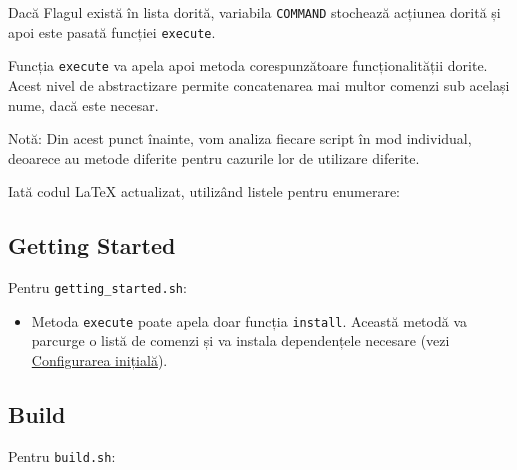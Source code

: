 Dacă Flagul există în lista dorită, variabila \texttt{COMMAND} stochează acțiunea dorită și apoi este pasată funcției \texttt{execute}.

Funcția \texttt{execute} va apela apoi metoda corespunzătoare funcționalității dorite. Acest nivel de abstractizare permite concatenarea mai multor comenzi sub același nume, dacă este necesar.

Notă: Din acest punct înainte, vom analiza fiecare script în mod individual, deoarece au metode diferite pentru cazurile lor de utilizare diferite.

Iată codul LaTeX actualizat, utilizând listele pentru enumerare:

\subsection{Getting Started}
Pentru \texttt{getting\_started.sh}:

\begin{itemize}
    \item Metoda \texttt{execute} poate apela doar funcția \texttt{install}. Această metodă va parcurge o listă de comenzi și va instala dependențele necesare (vezi \hyperref[first-time-setup]{Configurarea inițială}).
\end{itemize}

\subsection{Build}
Pentru \texttt{build.sh}:

